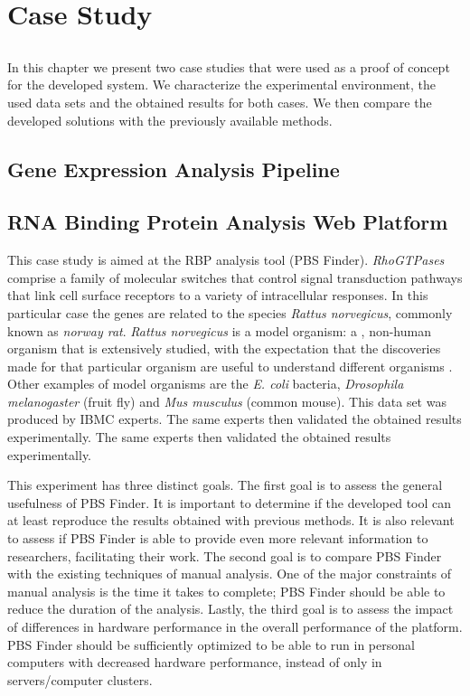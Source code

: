 \chapter{Case Study} \label{chap:casestudy}

\section*{}

In this chapter we present two case studies that were used as a proof of concept
for the developed system. We characterize the experimental environment, the used
data sets and the obtained results for both cases. We then compare the developed
solutions with the previously available methods.

\section{Gene Expression Analysis Pipeline}

\section{RNA Binding Protein Analysis Web Platform}

This case study is aimed at the RBP analysis tool (PBS Finder).
\emph{RhoGTPases} comprise a family of molecular switches that control signal
transduction pathways that link cell surface receptors to a variety of
intracellular responses. In this particular case the genes are related to the
species \emph{Rattus norvegicus}, commonly known as \emph{norway rat}.
\emph{Rattus norvegicus} is a model organism: a , non-human organism
that is extensively studied, with the expectation that the discoveries made for
that particular organism are useful to understand different organisms
\cite{fields2005cell}. Other examples of model organisms are the \emph{E. coli}
bacteria, \emph{Drosophila melanogaster} (fruit fly) and \emph{Mus musculus}
(common mouse). This data set was produced by IBMC experts. The same experts
then validated the obtained results experimentally. The same experts then
validated the obtained results experimentally.

This experiment has three distinct goals. The first goal is to assess the
general usefulness of PBS Finder. It is important to determine if the developed
tool can at least reproduce the results obtained with previous methods. It is
also relevant to assess if PBS Finder is able to provide even more relevant
information to researchers, facilitating their work. The second goal is to
compare PBS Finder with the existing techniques of manual analysis. One of the
major constraints of manual analysis is the time it takes to complete; PBS
Finder should be able to reduce the duration of the analysis. Lastly, the third
goal is to assess the impact of differences in hardware performance in the
overall performance of the platform. PBS Finder should be sufficiently optimized
to be able to run in personal computers with decreased hardware performance,
instead of only in servers/computer clusters.

